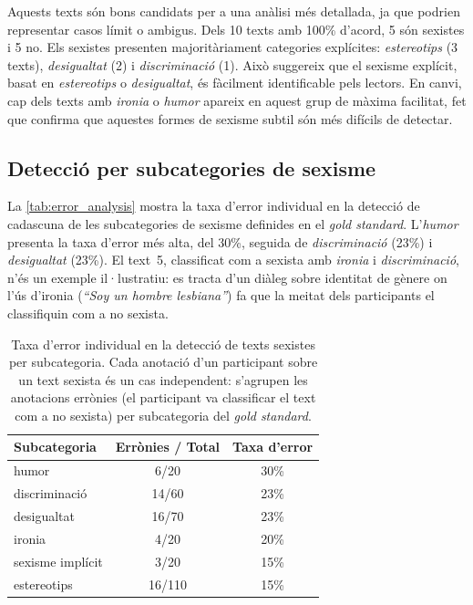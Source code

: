 Aquests texts són bons candidats per a una anàlisi més detallada, ja que podrien representar casos límit o ambigus.
Dels 10 texts amb 100\% d'acord, 5 són sexistes i 5 no.
Els sexistes presenten majoritàriament categories explícites: \textit{estereotips} (3 texts), \textit{desigualtat} (2) i \textit{discriminació} (1).
Això suggereix que el sexisme explícit, basat en \textit{estereotips} o \textit{desigualtat}, és fàcilment identificable pels lectors.
En canvi, cap dels texts amb \textit{ironia} o \textit{humor} apareix en aquest grup de màxima facilitat, fet que confirma que aquestes formes de sexisme subtil són més difícils de detectar.

\subsection{Detecció per subcategories de sexisme}

La \autoref{tab:error_analysis} mostra la taxa d'error individual en la detecció de cadascuna de les subcategories de sexisme definides en el \textit{gold standard}.
L'\textit{humor} presenta la taxa d'error més alta, del 30\%, seguida de \textit{discriminació} (23\%) i \textit{desigualtat} (23\%).
El text~5, classificat com a sexista amb \textit{ironia} i \textit{discriminació}, n'és un exemple il·lustratiu: es tracta d'un diàleg sobre identitat de gènere on l'ús d'ironia (\textit{``Soy un hombre lesbiana''}) fa que la meitat dels participants el classifiquin com a no sexista.

\iftables
\begin{table}[htbp]
\small
\centering
\begin{tabular}{lcc}
\toprule
\textbf{Subcategoria} & \textbf{Errònies / Total} & \textbf{Taxa d'error} \\
\midrule
humor              & 6/20 & 30\% \\
discriminació      & 14/60 & 23\% \\
desigualtat        & 16/70 & 23\% \\
ironia             & 4/20 & 20\% \\
sexisme implícit   & 3/20 & 15\% \\
estereotips        & 16/110 & 15\% \\
\bottomrule
\end{tabular}
\caption{Taxa d'error individual en la detecció de texts sexistes per subcategoria. Cada anotació d'un participant sobre un text sexista és un cas independent: s'agrupen les anotacions errònies (el participant va classificar el text com a no sexista) per subcategoria del \textit{gold standard}.}
\label{tab:error_analysis}
\end{table}
\fi

